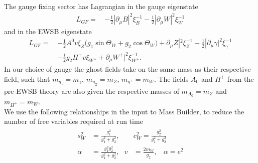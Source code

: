 \documentclass[11pt]{article}
\newcommand{\mbs}{\textsf{Mass Builder}}
\begin{document}
The gauge fixing sector has Lagrangian in the gauge eigenstate
\begin{align} 
L_{GF} = \, &-\frac{1}{2} |\partial_{\mu}B|^2 \xi_{B}^{-1}  -\frac{1}{2} |\partial_{\mu}W|^2 \xi_{W}^{-1} 
\end{align} 
and in the EWSB eigenstate
\begin{align} 
L_{GF} = \, & -\frac{1}{2} A^0 v \xi_{Z} \Big(g_1 \sin\Theta_W   + g_2 \cos\Theta_W  \Big) + \partial_{\mu}Z|^2 \xi_{Z}^{-1}  -\frac{1}{2} |\partial_{\mu}\gamma|^2 \xi_{\gamma}^{-1} \\&-\frac{i}{2} g_2 H^+ v \xi_{W^+}  + \partial_{\mu}W^+|^2 \xi_{W^+}^{-1}.
\end{align} 
In our choice of gauge the ghost fields take on the same mass as their respective field, such that $m_{\eta_{\gamma}} = m_{\gamma}$, $m_{\eta_Z}=m_{Z}$, $m_{\eta^+}=m_{W}$.  The fields $A_0$ and $H^+$ from the pre-EWSB theory are also given the respective masses of $m_{A_0}=m_Z$ and $m_{H^+}=m_W$.\\

We use the following relationships in the input to \mbs, to reduce the number of free variables required at run time
\begin{eqnarray}
\begin{split}
s_W^2&=\frac{g_1^2}{g_1^2+g_2^2}, \ \ \ & c_W^2=\frac{g_2^2}{g_1^2+g_2^2}\\
\alpha&=\frac{g_1^2g_2^2}{g_1^2+g_2^2}, \ \ \ v&=\frac{2m_W}{g_2}, \ \ \ \ \alpha=e^2
\end{split}
\end{eqnarray}
\end{document}
